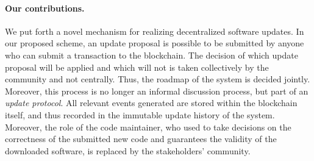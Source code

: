 \paragraph{Our contributions.}
We put forth a novel mechanism for realizing decentralized software updates. In 
our proposed scheme, an update proposal is possible to be submitted by anyone 
who can submit a transaction to the blockchain. The decision of which update 
proposal will be applied and which will not is taken collectively by the 
community and not centrally. Thus, the roadmap of the system is decided 
jointly. Moreover, this process is no longer an informal discussion process, 
but part of an \emph{update protocol}. All relevant events generated are stored 
within the blockchain itself, and thus recorded in the immutable update history 
of the system. Moreover, the role of the code maintainer, who used to take 
decisions on the correctness of the submitted new code and guarantees the 
validity of the downloaded software, is replaced by the stakeholders' community.


